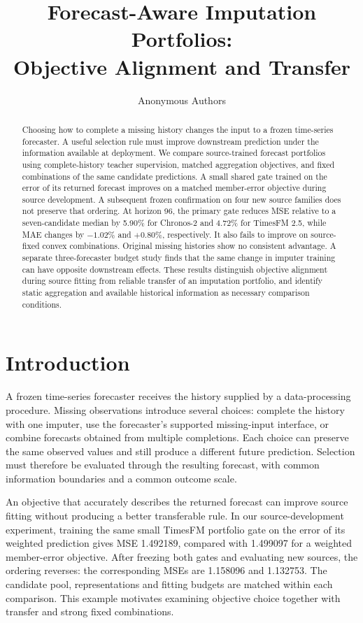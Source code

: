 \documentclass{article}
\title{Forecast-Aware Imputation Portfolios:\\Objective Alignment and Transfer}
\author{Anonymous Authors}
\begin{document}
\maketitle

\begin{abstract}
Choosing how to complete a missing history changes the input to a frozen time-series forecaster. A useful selection rule must improve downstream prediction under the information available at deployment. We compare source-trained forecast portfolios using complete-history teacher supervision, matched aggregation objectives, and fixed combinations of the same candidate predictions. A small shared gate trained on the error of its returned forecast improves on a matched member-error objective during source development. A subsequent frozen confirmation on four new source families does not preserve that ordering. At horizon 96, the primary gate reduces MSE relative to a seven-candidate median by 5.90\% for Chronos-2 and 4.72\% for TimesFM 2.5, while MAE changes by $-1.02\%$ and $+0.80\%$, respectively. It also fails to improve on source-fixed convex combinations. Original missing histories show no consistent advantage. A separate three-forecaster budget study finds that the same change in imputer training can have opposite downstream effects. These results distinguish objective alignment during source fitting from reliable transfer of an imputation portfolio, and identify static aggregation and available historical information as necessary comparison conditions.
\end{abstract}

\section{Introduction}

A frozen time-series forecaster receives the history supplied by a data-processing procedure. Missing observations introduce several choices: complete the history with one imputer, use the forecaster's supported missing-input interface, or combine forecasts obtained from multiple completions. Each choice can preserve the same observed values and still produce a different future prediction. Selection must therefore be evaluated through the resulting forecast, with common information boundaries and a common outcome scale.

An objective that accurately describes the returned forecast can improve source fitting without producing a better transferable rule. In our source-development experiment, training the same small TimesFM portfolio gate on the error of its weighted prediction gives MSE 1.492189, compared with 1.499097 for a weighted member-error objective. After freezing both gates and evaluating new sources, the ordering reverses: the corresponding MSEs are 1.158096 and 1.132753. The candidate pool, representations and fitting budgets are matched within each comparison. This example motivates examining objective choice together with transfer and strong fixed combinations.
\end{document}
